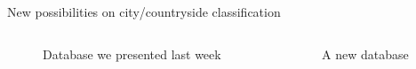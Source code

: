 \begin{frame}{New possibilities on city/countryside classification}
    \begin{columns}
        \begin{column}{0.4\paperwidth}
            \begin{figure}
                \caption{Database we presented last week}
            \end{figure}
        \end{column}
        \begin{column}{0.4\paperwidth}
            \begin{figure}
                \caption{A new database}
            \end{figure}
        \end{column}
    \end{columns}
\end{frame}

